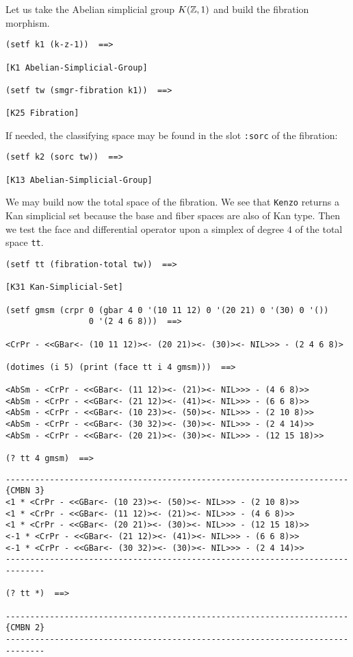 Let us take the Abelian simplicial group $K({\mathbb{Z}},1)$ and  build the fibration morphism.
{\footnotesize\begin{verbatim}
(setf k1 (k-z-1))  ==>

[K1 Abelian-Simplicial-Group]

(setf tw (smgr-fibration k1))  ==>

[K25 Fibration]
\end{verbatim}}
If needed, the classifying space may be found in the slot {\tt :sorc} of the fibration:
{\footnotesize\begin{verbatim}
(setf k2 (sorc tw))  ==>

[K13 Abelian-Simplicial-Group]
\end{verbatim}}
We may build now the total space of the fibration. We see that {\tt Kenzo} returns
a Kan simplicial set because the base and fiber spaces are also of
Kan type. Then we test the face and differential operator upon a simplex of degree $4$ of
the total space {\tt tt}.
{\footnotesize\begin{verbatim}
(setf tt (fibration-total tw))  ==>

[K31 Kan-Simplicial-Set]

(setf gmsm (crpr 0 (gbar 4 0 '(10 11 12) 0 '(20 21) 0 '(30) 0 '())
                 0 '(2 4 6 8)))  ==>

<CrPr - <<GBar<- (10 11 12)><- (20 21)><- (30)><- NIL>>> - (2 4 6 8)>

(dotimes (i 5) (print (face tt i 4 gmsm)))  ==>

<AbSm - <CrPr - <<GBar<- (11 12)><- (21)><- NIL>>> - (4 6 8)>>
<AbSm - <CrPr - <<GBar<- (21 12)><- (41)><- NIL>>> - (6 6 8)>>
<AbSm - <CrPr - <<GBar<- (10 23)><- (50)><- NIL>>> - (2 10 8)>>
<AbSm - <CrPr - <<GBar<- (30 32)><- (30)><- NIL>>> - (2 4 14)>>
<AbSm - <CrPr - <<GBar<- (20 21)><- (30)><- NIL>>> - (12 15 18)>>

(? tt 4 gmsm)  ==>
\end{verbatim}}
\newpage
{\footnotesize\begin{verbatim}
----------------------------------------------------------------------{CMBN 3}
<1 * <CrPr - <<GBar<- (10 23)><- (50)><- NIL>>> - (2 10 8)>>
<1 * <CrPr - <<GBar<- (11 12)><- (21)><- NIL>>> - (4 6 8)>>
<1 * <CrPr - <<GBar<- (20 21)><- (30)><- NIL>>> - (12 15 18)>>
<-1 * <CrPr - <<GBar<- (21 12)><- (41)><- NIL>>> - (6 6 8)>>
<-1 * <CrPr - <<GBar<- (30 32)><- (30)><- NIL>>> - (2 4 14)>>
------------------------------------------------------------------------------

(? tt *)  ==>

----------------------------------------------------------------------{CMBN 2}
------------------------------------------------------------------------------
\end{verbatim}}

